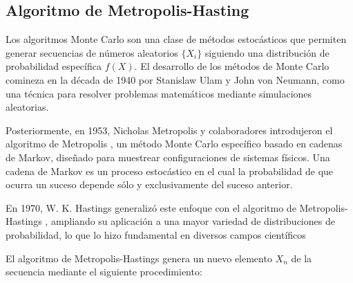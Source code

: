 \subsection{Algoritmo de Metropolis-Hasting}

Los algoritmos Monte Carlo son una clase de métodos estocásticos que permiten generar secuencias de números aleatorios \(\{X_{i}\}\) siguiendo una distribución de probabilidad específica \(f(X)\). El desarrollo de los métodos de Monte Carlo comineza en la década de 1940 por Stanislaw Ulam y John von Neumann, como una técnica para resolver problemas matemáticos mediante simulaciones aleatorias. 

\vspace{\baselineskip}

Posteriormente, en 1953, Nicholas Metropolis y colaboradores introdujeron el algoritmo de Metropolis \cite{metropolis1953}, un método Monte Carlo específico basado en cadenas de Markov, diseñado para muestrear configuraciones de sistemas físicos. Una cadena de Markov es un proceso estocástico en el cual la probabilidad
de que ocurra un suceso depende sólo y exclusivamente del suceso anterior.

\vspace{\baselineskip}

En 1970, W. K. Hastings generalizó este enfoque con el algoritmo de Metropolis-Hastings \cite{Hastings1970}, ampliando su aplicación a una mayor variedad de distribuciones de probabilidad, lo que lo hizo fundamental en diversos campos científicos

\vspace{\baselineskip}

El algoritmo de Metropolis-Hastings genera un nuevo elemento \(X_{n}\) de la secuencia mediante el siguiente  procedimiento:


